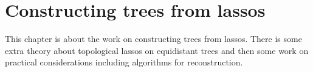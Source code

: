 \chapter{Constructing trees from lassos}
\label{cha:lasso-construction}

This chapter is about the work on constructing trees from lassos.  There is
some extra theory about topological lassos on equidistant trees and then some
work on practical considerations including algorithms for reconstruction.



